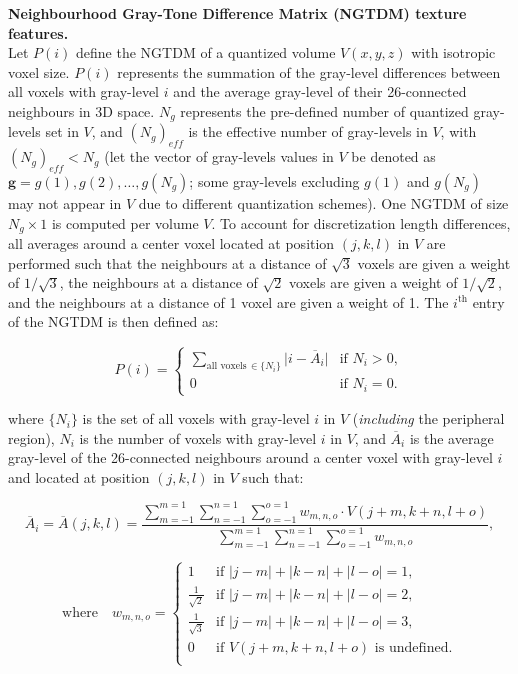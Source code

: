 \documentclass{article}
\begin{document}
\noindent \textbf{Neighbourhood Gray-Tone Difference Matrix (NGTDM) texture features.} \\
Let $P(i)$ define the NGTDM of a quantized volume $V(x,y,z)$ with isotropic voxel size. $P(i)$ represents the summation of the gray-level differences between all voxels with gray-level $i$ and the average gray-level of their 26-connected neighbours in 3D space. $N_g$ represents the pre-defined number of quantized gray-levels set in $V$, and $(N_g)_{eff}$ is the effective number of gray-levels in $V$, with $(N_g)_{eff} < N_g$ (let the vector of gray-levels values in $V$ be denoted as $\textbf{g} = g(1),g(2),\ldots,g(N_g)$; some gray-levels excluding $g(1)$ and $g(N_g)$ may not appear in $V$ due to different quantization schemes). One NGTDM of size $N_g \times 1$ is computed per volume $V$. To account for discretization length differences, all averages around a center voxel located at position $(j,k,l)$ in $V$ are performed such that the neighbours at a distance of $\sqrt{3}$ voxels are given a weight of $1/\sqrt{3}$, the neighbours at a distance of $\sqrt{2}$ voxels are given a weight of $1/\sqrt{2}$, and the neighbours at a distance of 1 voxel are given a weight of 1. The $i^{\mathrm{th}}$ entry of the NGTDM is then defined as:

\[P(i) = \begin{cases}
		 \sum_{\text{all voxels}\,\in \{N_i\}} \vert i-\overline{A}_i \vert & \text{if } N_i > 
		 0, \\
		 0 & \text{if } N_i = 0.
		 \end{cases}
\]

\noindent where $\{N_i\}$ is the set of all voxels with gray-level $i$ in $V$ (\textit{including} the peripheral region), $N_i$ is the number of voxels with gray-level $i$ in $V$, and $\overline{A}_i$ is the average gray-level of the 26-connected neighbours around a center voxel with gray-level $i$ and located at position $(j,k,l)$ in $V$ such that:

\[\overline{A}_i = \overline{A}(j,k,l) = \frac{\sum_{m=-1}^{m=1}\sum_{n=-1}^{n=1}\sum_{o=-1}^{o=1} w_{m,n,o} \cdot V(j+m,k+n,l+o)}{\sum_{m=-1}^{m=1}\sum_{n=-1}^{n=1}\sum_{o=-1}^{o=1} w_{m,n,o}},\]

\[\text{where} \quad w_{m,n,o} =  \begin{cases}
									1 & \text{if } |j-m| + |k-n| + |l-o| = 1,\\
									\frac{1}{\sqrt{2}} & \text{if } |j-m| + |k-n| + |l-o| = 
									2,\\
									\frac{1}{\sqrt{3}} & \text{if } |j-m| + |k-n| + |l-o| = 
									3,\\
									0 & \text{if } V(j+m,k+n,l+o) \text{ is undefined.} \\								
								\end{cases}\]
\end{document}
